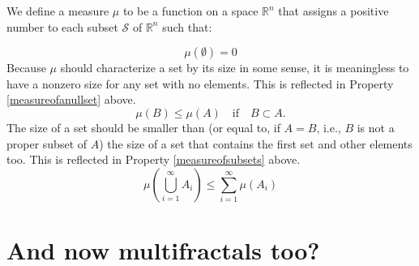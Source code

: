 \begin{mydef}
We define a measure $ \mu $ to be a function on a space $ \mathbb{R}^{n} $ that assigns a positive number to each subset $ \mathcal{S} $ of $ \mathbb{R}^{n} $ such that:

{\addtolength{\leftskip}{10mm}
\begin{equation}
\mu(\emptyset) = 0
\end{equation}
Because $\mu$ should characterize a set by its size in some sense, it is meaningless to have a nonzero size for any set with no elements. This is reflected in Property \ref{measureofanullset} above.
\begin{equation}
\mu(B) \le \mu(A) \mathrm{ \quad if \quad }  B \subset A.
\end{equation} 
The size of a set should be smaller than (or equal to, if $ A = B $, i.e., $B$ is not a proper subset of $A$) the size of a set that contains the first set and other elements too. This is reflected in Property \ref{measureofsubsets} above.
\begin{equation}
\mu\left(\bigcup_{i=1}^{\infty} A_i\right) \le \sum_{i=1}^{\infty} \mu(A_i) 
\end{equation}

}

\end{mydef}

\section{And now multifractals too?}

\citep{mandelbrotmultifractal}






















